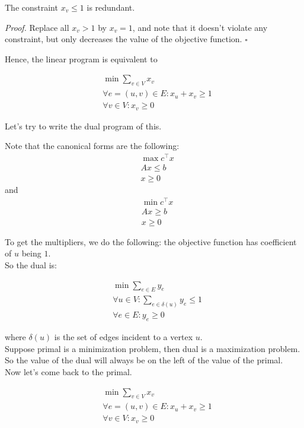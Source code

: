 \documentclass[a4paper]{article}
\newenvironment{proof}{\begin{breakbox}\textit{Proof.}}{\hfill$\square$\end{breakbox}}
\newcommand{\nl}{\vspace{0.2cm}\\}
\begin{document}
\begin{claim}
    The constraint $x_v \le 1$ is redundant.
\end{claim}
\begin{proof}
    Replace all $x_v > 1$ by $x_v = 1$, and note that it doesn't violate any constraint, but only decreases the value of the objective function.
\end{proof}

Hence, the linear program is equivalent to

\begin{align*}
    &\min \sum_{v \in V} x_v\\
    &\forall e = (u, v) \in E: x_u + x_v \ge 1\\
    &\forall v \in V: x_v \ge 0
\end{align*}

Let's try to write the dual program of this.\nl

\begin{note}
    Note that the canonical forms are the following:
    \begin{align*}
        &\max c^\top x\\
        &Ax \le b\\
        &x \ge 0
    \end{align*}
    and
    \begin{align*}
        &\min c^\top x\\
        &Ax \ge b\\
        &x \ge 0
    \end{align*}
\end{note}

To get the multipliers, we do the following: the objective function has coefficient of $u$ being $1$.\nl
So the dual is:

\begin{align*}
    &\min \sum_{e \in E} y_e\\
    &\forall u \in V: \sum_{e \in \delta(u)} y_e \le 1\\
    &\forall e \in E: y_e \ge 0
\end{align*}

where $\delta(u)$ is the set of edges incident to a vertex $u$.\nl

Suppose primal is a minimization problem, then dual is a maximization problem.\nl
So the value of the dual will always be on the left of the value of the primal.\nl

Now let's come back to the primal.

\begin{align*}
    &\min \sum_{v \in V} x_v\\
    &\forall e = (u, v) \in E: x_u + x_v \ge 1\\
    &\forall v \in V: x_v \ge 0
\end{align*}
\end{document}
